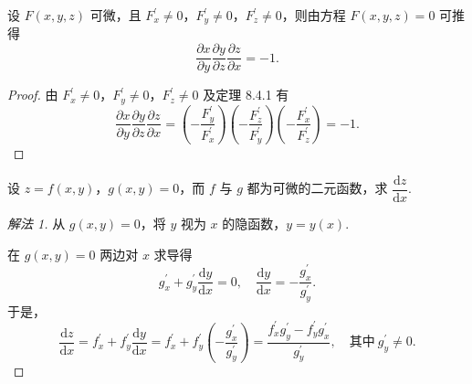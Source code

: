 \begin{example}\label{ex:8.4.8}
设 $F(x,y,z)$ 可微，且 $F_{x}^{\prime} \neq 0$，$F_{y}^{\prime} \neq 0$，$F_{z}^{\prime} \neq 0$，则由方程 $F(x,y,z) = 0$ 可推得
\[
  \frac{\partial x}{\partial y}\frac{\partial y}{\partial z}\frac{\partial z}{\partial x} = -1.
\]
\end{example}

\begin{proof}
由 $F_{x}^{\prime} \neq 0$，$F_{y}^{\prime} \neq 0$，$F_{z}^{\prime} \neq 0$ 及定理 8.4.1 有
\[
  \frac{\partial x}{\partial y}\frac{\partial y}{\partial z}\frac{\partial z}{\partial x} = \left(-\frac{F_{y}^{\prime}}{F_{x}^{\prime}}\right)\left(-\frac{F_{z}^{\prime}}{F_{y}^{\prime}}\right)\left(-\frac{F_{x}^{\prime}}{F_{z}^{\prime}}\right) = -1.
\]
\end{proof}

\begin{example}\label{ex:8.4.9}
设 $z = f(x,y)$，$g(x,y) = 0$，而 $f$ 与 $g$ 都为可微的二元函数，求 $\dfrac{\mathrm{d}z}{\mathrm{d}x}$.
\end{example}

\begin{proof}[解法 1]
从 $g(x,y) = 0$，将 $y$ 视为 $x$ 的隐函数，$y = y(x)$.

在 $g(x,y) = 0$ 两边对 $x$ 求导得
\[
  g_{x}^{\prime} + g_{y}^{\prime}\frac{\mathrm{d}y}{\mathrm{d}x} = 0,\quad \frac{\mathrm{d}y}{\mathrm{d}x} = -\frac{g_{x}^{\prime}}{g_{y}^{\prime}}.
\]
于是，
\[
  \frac{\mathrm{d}z}{\mathrm{d}x} = f_{x}^{\prime} + f_{y}^{\prime}\frac{\mathrm{d}y}{\mathrm{d}x} = f_{x}^{\prime} + f_{y}^{\prime}\left(-\frac{g_{x}^{\prime}}{g_{y}^{\prime}}\right) = \frac{f_{x}^{\prime}g_{y}^{\prime} - f_{y}^{\prime}g_{x}^{\prime}}{g_{y}^{\prime}},\quad \text{其中}\ g_{y}^{\prime} \neq 0.
\]
\end{proof}

